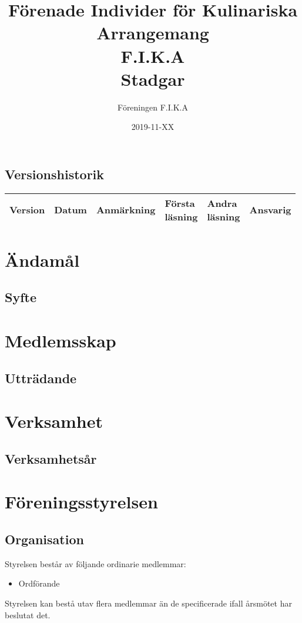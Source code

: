 \documentclass{article}
\title{Förenade Individer för Kulinariska Arrangemang \\
                F.I.K.A \\
                Stadgar}
\author{Föreningen F.I.K.A}
\date{2019-11-XX}
\begin{document}
\maketitle
\newpage

\subsection*{Versionshistorik}

\begin{tabularx}{\textwidth}{|l|l|X|l|l|l|}
\hline
Version & Datum & Anmärkning & \makecell{Första\\läsning} & \makecell{Andra\\läsning} & Ansvarig \\
\hline
\end{tabularx}
\newpage

\tableofcontents
\newpage
{}

\section{Ändamål}
\subsection{Syfte}

\section{Medlemsskap}

\subsection{Utträdande}

\section{Verksamhet}
\subsection{Verksamhetsår}

\section{Föreningsstyrelsen}
\subsection{Organisation}
Styrelsen består av följande ordinarie medlemmar:
\begin{itemize}
  \item Ordförande
\end{itemize}
Styrelsen kan bestå utav flera medlemmar än de specificerade ifall årsmötet har
beslutat det.
\end{document}
